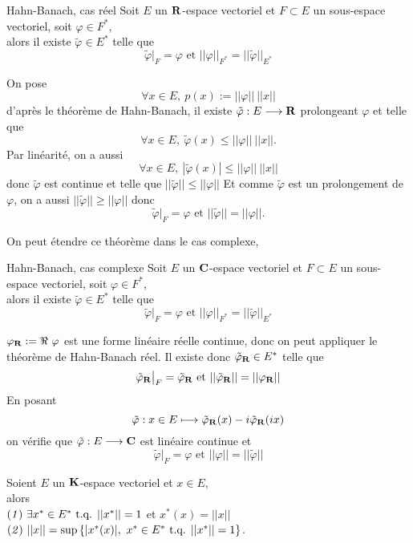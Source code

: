 \documentclass[a4paper,11pt, twoside]{article}
\begin{document}
\begin{thC}{Hahn-Banach, cas réel}
  Soit $E$ un $\mathbf R$-espace vectoriel et $F\subset E$ un sous-espace vectoriel, soit $\varphi\in F^*$,\\

  alors il existe $\tilde\varphi\in E^*$ telle que 
  $$\tilde\varphi\big|_F=\varphi\text{ et }||\varphi||_{F^*}=||\tilde\varphi||_{E^*}$$
\end{thC}


\begin{Proof}
  On pose 
  $$\forall x\in E,\ p(x):=||\varphi||\ ||x||$$
  d'après le théorème de Hahn-Banach, il existe $\tilde\varphi:E\longrightarrow\mathbf R$ prolongeant $\varphi$ et telle que 
  $$\forall x\in E,\ \tilde\varphi(x)\leqslant ||\varphi||\ ||x||.$$
  Par linéarité, on a aussi 
  $$\forall x\in E,\ |\tilde\varphi(x)|\leqslant ||\varphi||\ ||x||$$
  donc $\tilde\varphi$ est continue et telle que $||\tilde\varphi||\leqslant ||\varphi||$
  Et comme $\tilde\varphi$ est un prolongement de $\varphi$, on a aussi $||\tilde\varphi||\geqslant ||\varphi||$ donc 
  $$\tilde\varphi\big|_F =\varphi\text{ et }||\tilde\varphi||= ||\varphi||.$$
\end{Proof}

On peut étendre ce théorème dans le cas complexe, 


\begin{thC}{Hahn-Banach, cas complexe}
  Soit $E$ un $\mathbf C$-espace vectoriel et $F\subset E$ un sous-espace vectoriel, soit $\varphi\in F^*$,\\

  alors il existe $\tilde\varphi\in E^*$ telle que 
  $$\tilde\varphi\big|_F=\varphi\text{ et }||\varphi||_{F^*}=||\tilde\varphi||_{E^*}$$
\end{thC}
  

\begin{Proof}
  $\varphi_\mathbf R:=\Re\ \varphi$ est une forme linéaire réelle continue, donc on peut appliquer le théorème de Hahn-Banach réel. Il existe donc $\tilde\varphi_\mathbf R\in E^*$ telle que 
  $$\tilde\varphi_\mathbf R\big|_F=\tilde\varphi_\mathbf R\text{ et }||\tilde\varphi_\mathbf R||=||\varphi_\mathbf R||$$
  En posant 
  $$\tilde\varphi:x\in E\longmapsto \tilde\varphi_\mathbf R(x)-i\tilde\varphi_\mathbf R(ix)$$
  on vérifie que $\tilde\varphi:E\longrightarrow\mathbf C$ est linéaire continue et 
  $$\tilde\varphi\big|_F=\varphi\text{ et }||\varphi||=||\tilde\varphi||$$
\end{Proof}


\begin{corollaire}
  Soient $E$ un $\mathbf K$-espace vectoriel et $x\in E$,\\

  alors\\
  $(\mathit 1)\ \exists x^*\in E^*\text{ t.q. } ||x^*||=1$ et $x^*(x)=||x||$\\[1em]
  $(\mathit 2)\ ||x||=\mathrm{sup}\left\{|x^*(x)|,\ x^*\in E^*\tq ||x^*||=1\right\}$.
\end{corollaire}
\end{document}
